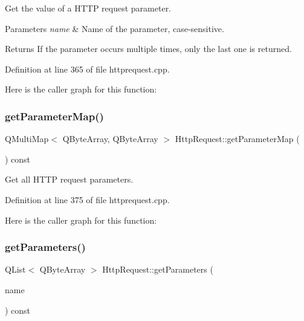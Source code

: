 Get the value of a H\+T\+TP request parameter. 
\begin{DoxyParams}{Parameters}
{\em name} & Name of the parameter, case-\/sensitive. \\
\hline
\end{DoxyParams}
\begin{DoxyReturn}{Returns}
If the parameter occurs multiple times, only the last one is returned. 
\end{DoxyReturn}


Definition at line 365 of file httprequest.\+cpp.

Here is the caller graph for this function\+:
\mbox{\label{classstefanfrings_1_1_http_request_a25c8d4b0ff23dc67bbbbb2b03bba3a5b}} 
\subsubsection{\texorpdfstring{get\+Parameter\+Map()}{getParameterMap()}}
{\footnotesize\ttfamily Q\+Multi\+Map$<$ Q\+Byte\+Array, Q\+Byte\+Array $>$ Http\+Request\+::get\+Parameter\+Map (\begin{DoxyParamCaption}{ }\end{DoxyParamCaption}) const}

Get all H\+T\+TP request parameters. 

Definition at line 375 of file httprequest.\+cpp.

Here is the caller graph for this function\+:
\mbox{\label{classstefanfrings_1_1_http_request_a0711a770d0547a75f5cfb68c9ac1a760}} 
\subsubsection{\texorpdfstring{get\+Parameters()}{getParameters()}}
{\footnotesize\ttfamily Q\+List$<$ Q\+Byte\+Array $>$ Http\+Request\+::get\+Parameters (\begin{DoxyParamCaption}\item[{const Q\+Byte\+Array \&}]{name }\end{DoxyParamCaption}) const}

